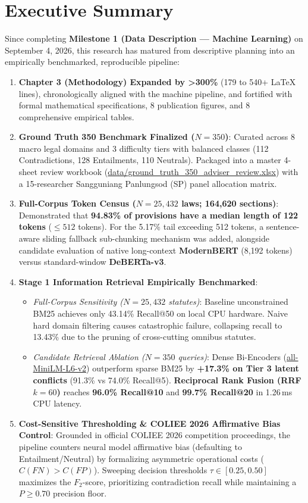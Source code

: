 \documentclass[10pt,letterpaper]{article}
\begin{document}
\section*{Executive Summary}
Since completing \textbf{Milestone 1 (Data Description --- Machine Learning)} on September 4, 2026, this research has matured from descriptive planning into an empirically benchmarked, reproducible pipeline:
\begin{enumerate}
    \item \textbf{Chapter 3 (Methodology) Expanded by >300\%} (179 to 540+ \LaTeX{} lines), chronologically aligned with the machine pipeline, and fortified with formal mathematical specifications, 8 publication figures, and 8 comprehensive empirical tables.
    \item \textbf{Ground Truth 350 Benchmark Finalized ($N=350$)}: Curated across 8 macro legal domains and 3 difficulty tiers with balanced classes (112 Contradictions, 128 Entailments, 110 Neutrals). Packaged into a master 4-sheet review workbook (\url{data/ground_truth_350_adviser_review.xlsx}) with a 15-researcher Sangguniang Panlungsod (SP) panel allocation matrix.
    \item \textbf{Full-Corpus Token Census ($N = 25,432$ laws; 164,620 sections)}: Demonstrated that \textbf{94.83\% of provisions have a median length of 122 tokens} ($\le 512$ tokens). For the 5.17\% tail exceeding 512 tokens, a sentence-aware sliding fallback sub-chunking mechanism was added, alongside candidate evaluation of native long-context \textbf{ModernBERT} (8,192 tokens) versus standard-window \textbf{DeBERTa-v3}.
    \item \textbf{Stage 1 Information Retrieval Empirically Benchmarked}:
    \begin{itemize}
        \item \textit{Full-Corpus Sensitivity ($N = 25,432$ statutes)}: Baseline unconstrained BM25 achieves only 43.14\% Recall@50 on local CPU hardware. Naive hard domain filtering causes catastrophic failure, collapsing recall to 13.43\% due to the pruning of cross-cutting omnibus statutes.
        \item \textit{Candidate Retrieval Ablation ($N = 350$ queries)}: Dense Bi-Encoders (\url{all-MiniLM-L6-v2}) outperform sparse BM25 by \textbf{+17.3\% on Tier 3 latent conflicts} (91.3\% vs 74.0\% Recall@5). \textbf{Reciprocal Rank Fusion (RRF $k=60$)} reaches \textbf{96.0\% Recall@10} and \textbf{99.7\% Recall@20} in 1.26\,ms CPU latency.
    \end{itemize}
    \item \textbf{Cost-Sensitive Thresholding \& COLIEE 2026 Affirmative Bias Control}: Grounded in official COLIEE 2026 competition proceedings, the pipeline counters neural model affirmative bias (defaulting to Entailment/Neutral) by formalizing asymmetric operational costs ($C(FN) > C(FP)$). Sweeping decision thresholds $\tau \in [0.25, 0.50]$ maximizes the $F_2$-score, prioritizing contradiction recall while maintaining a $P \ge 0.70$ precision floor.

\end{enumerate}
\end{document}
